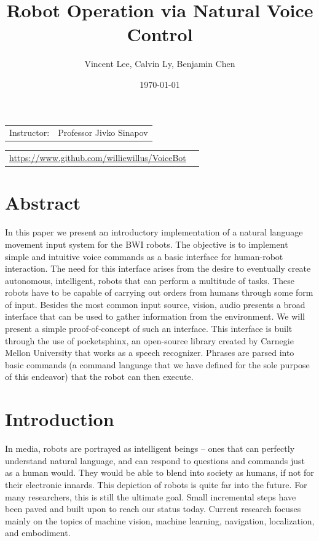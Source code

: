 \documentclass{article}
\title{\bf{Robot Operation via Natural Voice Control}} %
\author{Vincent Lee, Calvin Ly, Benjamin Chen\\} %
\date{\today} %
\begin{document}
\maketitle %

\onehalfspacing
\begin{center}
\begin{tabular}{l r}
Instructor: & Professor Jivko Sinapov
\end{tabular}
\end{center}

\begin{center}
\begin{tabular}{l r}
\url{https://www.github.com/williewillus/VoiceBot}
\end{tabular}
\end{center}




\section{Abstract}
In this paper we present an introductory implementation of a natural language movement input system for the BWI robots. The objective is to implement simple and intuitive voice commands as a basic interface for human-robot interaction. The need for this interface arises from the desire to eventually create autonomous, intelligent, robots that can perform a multitude of tasks. These robots have to be capable of carrying out orders from humans through some form of input. Besides the most common input source, vision, audio presents a broad interface that can be used to gather information from the environment. We will present a simple proof-of-concept of such an interface. This interface is built through the use of pocketsphinx, an open-source library created by Carnegie Mellon University that works as a speech recognizer. Phrases are parsed into basic commands (a command language that we have defined for the sole purpose of this endeavor) that the robot can then execute.

\section{Introduction}
In media, robots are portrayed as intelligent beings -- ones that can perfectly understand natural language, and can respond to questions and commands just as a human would. They would be able to blend into society as humans, if not for their electronic innards. This depiction of robots is quite far into the future. For many researchers, this is still the ultimate goal. Small incremental steps have been paved and built upon to reach our status today. Current research focuses mainly on the topics of machine vision, machine learning, navigation, localization, and embodiment.\par
\end{document}
